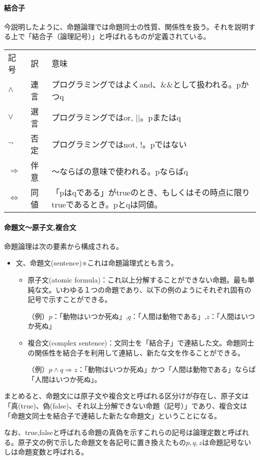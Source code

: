\documentclass[dvipdfmx]{jsarticle}
\begin{document}
  \paragraph{結合子}
  今説明したように、命題論理では命題同士の性質、関係性を扱う。それを説明する上で「結合子（論理記号）」と呼ばれるものが定義されている。
    \begin{table}[H]
      \centering
      \begin{tabular}{lll}
      記号                & 訳 & 意味\\
      $\wedge$          & 連言 & プログラミングではよくand、\&\&として扱われる。pかつq\\
      $\vee$            & 選言 & プログラミングではor, ||。pまたはq\\
      $\neg$            & 否定 & プログラミングではnot, !。pではない\\
      $\Rightarrow$     & 伴意 &〜ならばの意味で使われる。pならばq\\
      $\Leftrightarrow$ & 同値 &「pはqである」がtrueのとき、もしくはその時点に限りtrueであるとき。pとqは同値。
      \end{tabular}
  \end{table}
  \paragraph{命題文〜原子文,複合文}
  命題論理は次の要素から構成される。
  \begin{itemize}
    \item 文、命題文(sentence)※これは命題論理式とも言う。
    \begin{itemize}
      \item 原子文(atomic formula)：これ以上分解することができない命題。最も単純な文。いわゆる１つの命題であり、以下の例のようにそれぞれ固有の記号で示すことができる。\par
      （例）$p$：「動物はいつか死ぬ」,$q$：「人間は動物である」,$z$：「人間はいつか死ぬ」
      \item 複合文(complex sentence)：文同士を「結合子」で連結した文。命題同士の関係性を結合子を利用して連結し、新たな文を作ることができる。\par
      （例）$p \wedge q \Rightarrow z$：「動物はいつか死ぬ」かつ「人間は動物である」ならば「人間はいつか死ぬ」。
    \end{itemize}
  \end{itemize}
  まとめると、命題文には原子文や複合文と呼ばれる区分けが存在し、原子文は「真(true)、偽(false)、それ以上分解できない命題（記号）」であり、複合文は「命題文同士を結合子で連結した新たな命題文」ということになる。\par
  なお、true,falseと呼ばれる命題の真偽を示すこれらの記号は論理定数と呼ばれる。原子文の例で示した命題文を各記号に置き換えたもの$p,q,z$は命題記号ないしは命題変数と呼ばれる。\par
\end{document}
